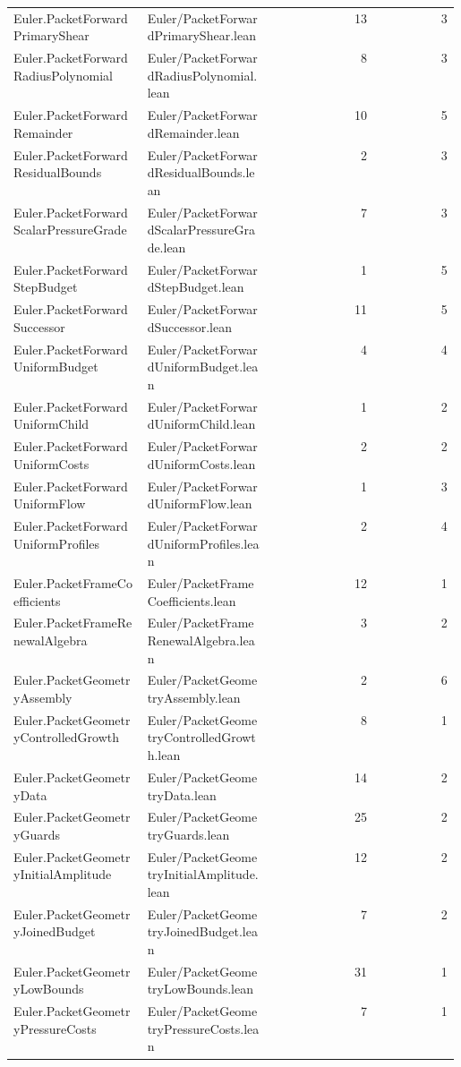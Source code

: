 \begin{longtable}{p{0.30\linewidth}p{0.28\linewidth}rr}
Euler.PacketForwardPrimaryShear & Euler/PacketForwardPrimaryShear.lean & 13 & 3\\
Euler.PacketForwardRadiusPolynomial & Euler/PacketForwardRadiusPolynomial.lean & 8 & 3\\
Euler.PacketForwardRemainder & Euler/PacketForwardRemainder.lean & 10 & 5\\
Euler.PacketForwardResidualBounds & Euler/PacketForwardResidualBounds.lean & 2 & 3\\
Euler.PacketForwardScalarPressureGrade & Euler/PacketForwardScalarPressureGrade.lean & 7 & 3\\
Euler.PacketForwardStepBudget & Euler/PacketForwardStepBudget.lean & 1 & 5\\
Euler.PacketForwardSuccessor & Euler/PacketForwardSuccessor.lean & 11 & 5\\
Euler.PacketForwardUniformBudget & Euler/PacketForwardUniformBudget.lean & 4 & 4\\
Euler.PacketForwardUniformChild & Euler/PacketForwardUniformChild.lean & 1 & 2\\
Euler.PacketForwardUniformCosts & Euler/PacketForwardUniformCosts.lean & 2 & 2\\
Euler.PacketForwardUniformFlow & Euler/PacketForwardUniformFlow.lean & 1 & 3\\
Euler.PacketForwardUniformProfiles & Euler/PacketForwardUniformProfiles.lean & 2 & 4\\
Euler.PacketFrameCoefficients & Euler/PacketFrameCoefficients.lean & 12 & 1\\
Euler.PacketFrameRenewalAlgebra & Euler/PacketFrameRenewalAlgebra.lean & 3 & 2\\
Euler.PacketGeometryAssembly & Euler/PacketGeometryAssembly.lean & 2 & 6\\
Euler.PacketGeometryControlledGrowth & Euler/PacketGeometryControlledGrowth.lean & 8 & 1\\
Euler.PacketGeometryData & Euler/PacketGeometryData.lean & 14 & 2\\
Euler.PacketGeometryGuards & Euler/PacketGeometryGuards.lean & 25 & 2\\
Euler.PacketGeometryInitialAmplitude & Euler/PacketGeometryInitialAmplitude.lean & 12 & 2\\
Euler.PacketGeometryJoinedBudget & Euler/PacketGeometryJoinedBudget.lean & 7 & 2\\
Euler.PacketGeometryLowBounds & Euler/PacketGeometryLowBounds.lean & 31 & 1\\
Euler.PacketGeometryPressureCosts & Euler/PacketGeometryPressureCosts.lean & 7 & 1\\

\end{longtable}
